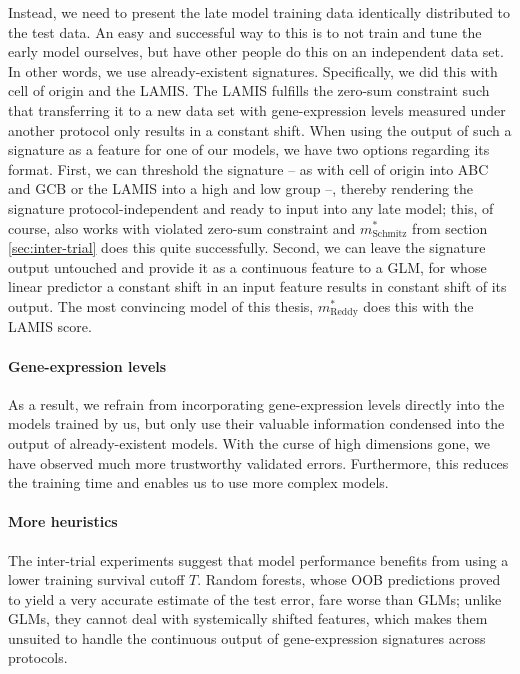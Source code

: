 Instead, we need to present the late model training data identically distributed to the test 
data. An easy and successful way to this is to not train and tune the early model ourselves, but have 
other people do this on an independent data set. In other words, we use already-existent signatures. 
Specifically, we did this with cell of origin and the LAMIS. The LAMIS fulfills the 
zero-sum constraint such that transferring it to a new data set with gene-expression levels 
measured under another protocol only results in a constant shift. When using the output of such 
a signature as a feature for one of our models, we have two options regarding its format.
First, we can threshold the signature -- as with cell of origin into ABC and GCB or the LAMIS into 
a high and low group --, thereby rendering the signature protocol-independent and ready to input 
into any late model; this, of course, also works with violated zero-sum constraint and 
$m^*_\text{Schmitz}$ from section \ref{sec:inter-trial} 
does this quite successfully. Second, we can leave the signature output untouched and provide it as a 
continuous feature to a GLM, for whose linear predictor a constant shift in an input feature results 
in constant shift of its output. The most convincing model of this thesis, $m^*_\text{Reddy}$ does 
this with the LAMIS score.

\paragraph{Gene-expression levels}
As a result, we refrain from incorporating gene-expression levels directly into the models trained 
by us, but only use their valuable information condensed into the output of already-existent models. 
With the curse of high dimensions gone, we have observed much more trustworthy validated errors. 
Furthermore, this reduces the training time and enables us to use more complex models.

\paragraph{More heuristics}

The inter-trial experiments suggest that model performance benefits from using a lower training 
survival cutoff $T$. Random forests, whose OOB predictions proved to yield a very accurate estimate 
of the test error, fare worse than GLMs; unlike GLMs, they cannot deal with systemically shifted 
features, which makes them unsuited to handle the continuous output of gene-expression signatures
across protocols.

